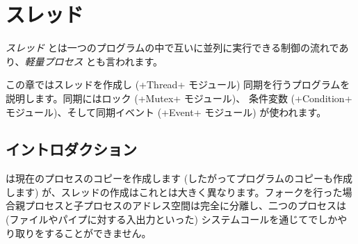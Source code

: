 %
%

\chapter{\label{sec/coprocessus}スレッド}

\emph{スレッド} とは一つのプログラムの中で互いに並列に実行できる制御の流れであり、\emph{軽量プロセス} とも言われます。

この章ではスレッドを作成し (\ml+Thread+ モジュール) 同期を行うプログラムを説明します。同期にはロック (\ml+Mutex+ モジュール)、 条件変数 (\ml+Condition+ モジュール)、そして同期イベント (\ml+Event+ モジュール) が使われます。

\section{イントロダクション}

 は現在のプロセスのコピーを作成します (したがってプログラムのコピーも作成します) が、スレッドの作成はこれとは大きく異なります。フォークを行った場合親プロセスと子プロセスのアドレス空間は完全に分離し、二つのプロセスは (ファイルやパイプに対する入出力といった) システムコールを通じてでしかやり取りをすることができません。

